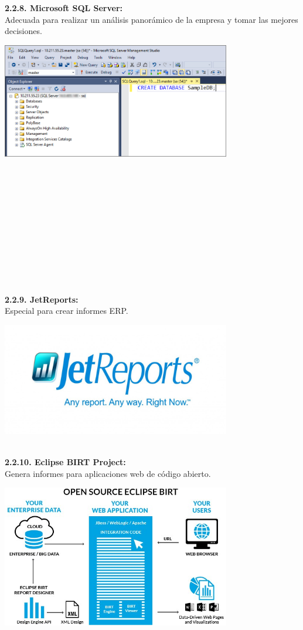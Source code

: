 \begin{flushleft}
\textbf{2.2.8. Microsoft SQL Server: }\\
Adecuada para realizar un análisis panorámico de la empresa y tomar las mejores decisiones.
	\begin{center}
	\includegraphics[width=10cm]{./Imagenes/BIimagen8}
	\end{center}
\textbf{}\\
	\textbf{}\\
\textbf{}\\
\textbf{}\\
\textbf{}\\
\textbf{}\\
	\textbf{}\\
\textbf{}\\
\textbf{}\\
\textbf{}\\
\textbf{}\\
\textbf{2.2.9. JetReports: }\\
Especial para crear informes ERP.
	\begin{center}
	\includegraphics[width=10cm]{./Imagenes/BIimagen9}
	\end{center}
\textbf{}\\
	
\textbf{2.2.10. Eclipse BIRT Project: }\\
Genera informes para aplicaciones web de código abierto.
	\begin{center}
	\includegraphics[width=10cm]{./Imagenes/BIimagen10}
	\end{center}
\textbf{}\\
	

\end{flushleft}
